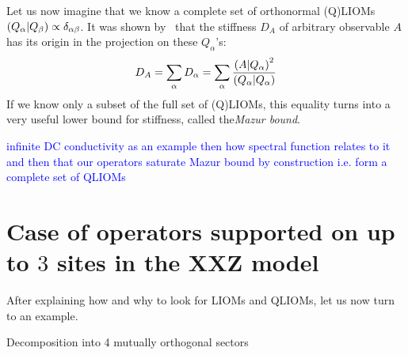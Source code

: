 Let us now imagine that we know a complete set of orthonormal (Q)LIOMs 
\(\left(Q_{\alpha} \middle| Q_{\beta}\right) \propto \delta_{\alpha\beta}\). It was shown 
by~\textcite{Mazur1969} that the stiffness \(D_{A}\) of arbitrary observable \(A\) has its origin
in the projection on these \(Q_{\alpha}\)'s:
\begin{equation}
  D_A = \sum_{\alpha} D_{\alpha} = \sum_{\alpha} \frac{\left(A \middle| Q_{\alpha}\right)^2}
  {\left(Q_{\alpha} \middle| Q_{\alpha}\right)}
  \label{eq:mazur equality}
\end{equation}
If we know only a subset of the full set of (Q)LIOMs, this equality turns into 
a very useful lower bound for stiffness, called the\textit{Mazur bound}.

\textcolor{blue}{infinite DC conductivity as an example}
\textcolor{blue}{then how spectral function relates to it}
\textcolor{blue}{and then that our operators saturate Mazur bound by construction i.e. form
a complete set of QLIOMs}



\section{Case of operators supported on up to \(3\) sites in the XXZ model\label{sec:example}}
After explaining how and why to look for LIOMs and QLIOMs, let us now turn to an example.


Decomposition into 4 mutually orthogonal sectors


